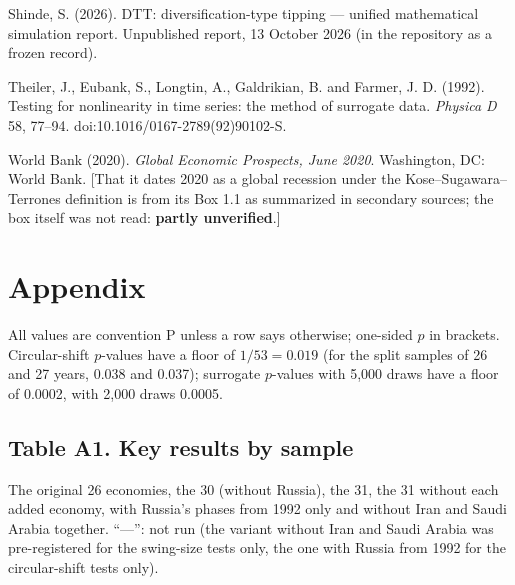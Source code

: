 \documentclass[11pt,a4paper]{article}
\begin{document}
Shinde, S. (2026). DTT: diversification-type tipping — unified mathematical simulation report. Unpublished report, 13 October 2026 (in the repository as a frozen record).

Theiler, J., Eubank, S., Longtin, A., Galdrikian, B. and Farmer, J. D. (1992). Testing for nonlinearity in time series: the method of surrogate data. \emph{Physica D} 58, 77–94. doi:10.1016/0167-2789(92)90102-S.

World Bank (2020). \emph{Global Economic Prospects, June 2020}. Washington, DC: World Bank. {[}That it dates 2020 as a global recession under the Kose–Sugawara–Terrones definition is from its Box 1.1 as summarized in secondary sources; the box itself was not read: \textbf{partly unverified}.{]}

\section{Appendix}\label{appendix}

All values are convention P unless a row says otherwise; one-sided \(p\) in brackets. Circular-shift \(p\)-values have a floor of \(1/53 = 0.019\) (for the split samples of 26 and 27 years, 0.038 and 0.037); surrogate \(p\)-values with 5,000 draws have a floor of 0.0002, with 2,000 draws 0.0005.

\subsection{Table A1. Key results by sample}\label{table-a1.-key-results-by-sample}

The original 26 economies, the 30 (without Russia), the 31, the 31 without each added economy, with Russia's phases from 1992 only and without Iran and Saudi Arabia together. ``—'': not run (the variant without Iran and Saudi Arabia was pre-registered for the swing-size tests only, the one with Russia from 1992 for the circular-shift tests only).
\end{document}
